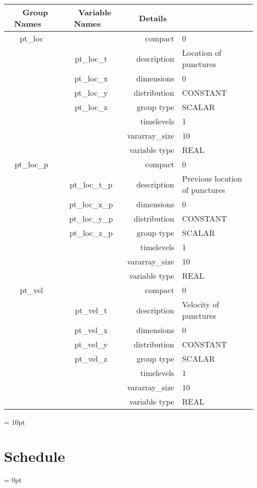 \begin{tabular*}{150mm}{|c|c@{\extracolsep{\fill}}|rl|} \hline 
~ {\bf Group Names} ~ & ~ {\bf Variable Names} ~  &{\bf Details} ~ & ~\\ 
\hline 
pt\_loc &  & compact & 0 \\ 
 & pt\_loc\_t & description & Location of punctures \\ 
 & pt\_loc\_x & dimensions & 0 \\ 
 & pt\_loc\_y & distribution & CONSTANT \\ 
 & pt\_loc\_z & group type & SCALAR \\ 
 &  & timelevels & 1 \\ 
 &  & vararray\_size & 10 \\ 
 &  & variable type & REAL \\ 
\hline 
pt\_loc\_p &  & compact & 0 \\ 
 & pt\_loc\_t\_p & description & Previous location of punctures \\ 
 & pt\_loc\_x\_p & dimensions & 0 \\ 
 & pt\_loc\_y\_p & distribution & CONSTANT \\ 
 & pt\_loc\_z\_p & group type & SCALAR \\ 
 &  & timelevels & 1 \\ 
 &  & vararray\_size & 10 \\ 
 &  & variable type & REAL \\ 
\hline 
pt\_vel &  & compact & 0 \\ 
 & pt\_vel\_t & description & Velocity of punctures \\ 
 & pt\_vel\_x & dimensions & 0 \\ 
 & pt\_vel\_y & distribution & CONSTANT \\ 
 & pt\_vel\_z & group type & SCALAR \\ 
 &  & timelevels & 1 \\ 
 &  & vararray\_size & 10 \\ 
 &  & variable type & REAL \\ 
\hline 
\end{tabular*} 



\vspace{5mm}\parskip = 10pt 

\section{Schedule} 


\parskip = 0pt


